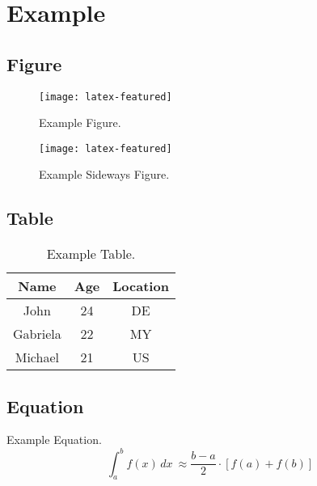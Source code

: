 \chapter{Example}

\section{Figure}

\begin{figure}
  \centering
  \texttt{[image: latex-featured]}
  \caption{Example Figure.}
  \label{fig:examplefigure}
\end{figure}

\begin{sidewaysfigure}
  \centering
  \texttt{[image: latex-featured]}
  \caption{Example Sideways Figure.}
  \label{fig:examplesidewaysfigure}
\end{sidewaysfigure}

\section{Table}

\begin{table}
  \centering
  \caption{Example Table.}
  \label{tab:exampletable}
  \begin{tabular}{ccc}
    \toprule
    Name & Age & Location \\ \midrule
    John & 24 & DE \\
    Gabriela & 22 & MY \\
    Michael & 21 & US \\ \bottomrule
  \end{tabular}
\end{table}

\section{Equation}

Example Equation.
\begin{equation}
  \int_{a}^{b} f(x) \, dx\ \approx \frac{b - a}{2} \cdot [f(a) + f(b)]
  \label{eq:exampleequation}
\end{equation}


